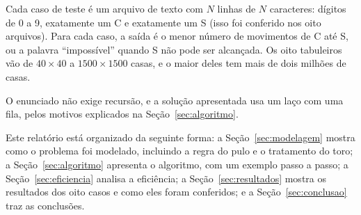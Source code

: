 Cada caso de teste é um arquivo de texto com $N$ linhas de $N$ caracteres: dígitos de 0 a 9,
exatamente um C e exatamente um S (isso foi conferido nos oito arquivos). Para cada caso, a saída
é o menor número de movimentos de C até S, ou a palavra ``impossível'' quando S não pode ser
alcançada. Os oito tabuleiros vão de $40 \times 40$ a $1500 \times 1500$ casas, e o maior
deles tem mais de dois milhões de casas.

O enunciado não exige recursão, e a solução apresentada usa um laço com uma fila, pelos
motivos explicados na Seção~\ref{sec:algoritmo}.

Este relatório está organizado da seguinte forma: a Seção~\ref{sec:modelagem} mostra como o
problema foi modelado, incluindo a regra do pulo e o tratamento do toro; a
Seção~\ref{sec:algoritmo} apresenta o algoritmo, com um exemplo passo a passo; a
Seção~\ref{sec:eficiencia} analisa a eficiência; a Seção~\ref{sec:resultados} mostra os
resultados dos oito casos e como eles foram conferidos; e a Seção~\ref{sec:conclusao} traz as
conclusões.
